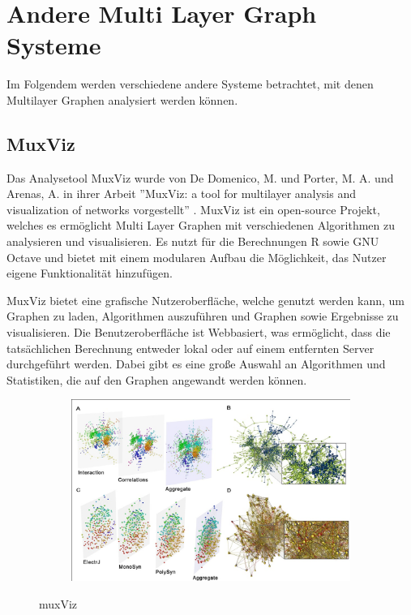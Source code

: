 \section{Andere Multi Layer Graph Systeme}

Im Folgendem werden verschiedene andere Systeme betrachtet, mit denen Multilayer Graphen analysiert werden können.

\subsection{MuxViz}

Das Analysetool MuxViz wurde von De Domenico, M. und Porter, M. A. und Arenas, A. in ihrer Arbeit ''MuxViz: a tool for multilayer analysis and visualization of networks vorgestellt'' \cite{De_Domenico_2014}.
MuxViz ist ein open-source Projekt, welches es ermöglicht Multi Layer Graphen mit verschiedenen Algorithmen zu analysieren und visualisieren. Es nutzt für die Berechnungen R sowie GNU Octave und bietet mit einem modularen Aufbau die Möglichkeit, das Nutzer eigene Funktionalität hinzufügen.


MuxViz bietet eine grafische Nutzeroberfläche, welche genutzt werden kann, um Graphen zu laden, Algorithmen auszuführen und Graphen sowie Ergebnisse zu visualisieren. Die Benutzeroberfläche ist Webbasiert, was ermöglicht, dass die tatsächlichen Berechnung entweder lokal oder auf einem entfernten Server durchgeführt werden.
Dabei gibt es eine große Auswahl an Algorithmen und Statistiken, die auf den Graphen angewandt werden können.


\begin{figure}
  \centering
  \begin{subfigure}[b]{1.0\textwidth}
    \includegraphics[width=1.0\linewidth]{img/muxViz.png}
  \end{subfigure}
  \caption{muxViz}
  \label{muxVizSample}
\end{figure}

